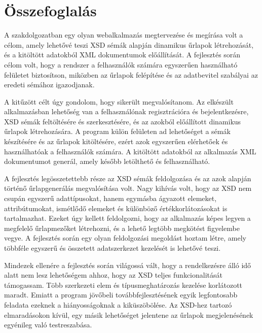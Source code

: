 \chapter{Összefoglalás}

A szakdolgozatban egy olyan webalkalmazás megtervezése és megírása volt a célom, amely lehetővé teszi XSD sémák alapján dinamikus űrlapok létrehozását, és a kitöltött adatokból XML dokumentumok előállítását. A fejlesztés során célom volt, hogy a rendszer a felhasználók számára egyszerűen használható felületet biztosítson, miközben az űrlapok felépítése és az adatbevitel szabályai az eredeti sémához igazodjanak.

A kitűzött célt úgy gondolom, hogy sikerült megvalósítanom. Az elkészült alkalmazásban lehetőség van a felhasználónak regisztrációra és bejelentkezésre, XSD sémák feltöltésére és szerkesztésére, és az azokból előállított dinamikus űrlapok létrehozására. A program külön felületen ad lehetőséget a sémák készítésére és az űrlapok kitöltésére, ezért azok egyszerűen elérhetőek és használhatóak a felhasználók számára. A kitöltött adatokból az alkalmazás XML dokumentumot generál, amely később letölthető és felhasználható.

A fejlesztés legösszetettebb része az XSD sémák feldolgozása és az azok alapján történő űrlapgenerálás megvalósítása volt. Nagy kihívás volt, hogy az XSD nem csupán egyszerű adattípusokat, hanem egymásba ágyazott elemeket, attribútumokat, ismétlődő elemeket és különböző értékkorlátozásokat is tartalmazhat. Ezeket úgy kellett feldolgozni, hogy az alkalmazás képes legyen a megfelelő űrlapmezőket létrehozni, és a lehető legtöbb megkötést figyelembe vegye. A fejlesztés során egy olyan feldolgozási megoldást hoztam létre, amely többféle egyszerű és összetett adatszerkezet kezelését is lehetővé teszi.

Mindezek ellenére a fejlesztés során világossá vált, hogy a rendelkezésre álló idő alatt nem lesz lehetőségem ahhoz, hogy az XSD teljes funkcionalitását támogassam. Több szerkezeti elem és típusmeghatározás kezelése korlátozott maradt. Emiatt a program jövőbeli továbbfejlesztésének egyik legfontosabb feladata ezeknek a hiányosságoknak a kiküszöbölése. Az XSD-hez tartozó elmaradásokon kívül, egy másik lehetőséget jelentene az űrlapok megjelenésének egyénileg való testreszabása.